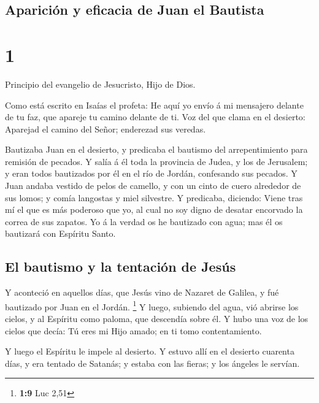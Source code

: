 \hypertarget{apariciuxf3n-y-eficacia-de-juan-el-bautista}{%
\subsection{Aparición y eficacia de Juan el
Bautista}\label{apariciuxf3n-y-eficacia-de-juan-el-bautista}}

\hypertarget{section}{%
\section{1}\label{section}}

 Principio del evangelio de Jesucristo, Hijo de Dios.

 Como está escrito en Isaías el profeta: He aquí yo envío á
mi mensajero delante de tu faz, que apareje tu camino delante de ti.
 Voz del que clama en el desierto: Aparejad el camino del
Señor; enderezad sus veredas.

 Bautizaba Juan en el desierto, y predicaba el bautismo del
arrepentimiento para remisión de pecados.  Y salía á él toda
la provincia de Judea, y los de Jerusalem; y eran todos bautizados por
él en el río de Jordán, confesando sus pecados.  Y Juan
andaba vestido de pelos de camello, y con un cinto de cuero alrededor de
sus lomos; y comía langostas y miel silvestre.  Y predicaba,
diciendo: Viene tras mí el que es más poderoso que yo, al cual no soy
digno de desatar encorvado la correa de sus zapatos.  Yo á
la verdad os he bautizado con agua; mas él os bautizará con Espíritu
Santo.

\hypertarget{el-bautismo-y-la-tentaciuxf3n-de-jesuxfas}{%
\subsection{El bautismo y la tentación de
Jesús}\label{el-bautismo-y-la-tentaciuxf3n-de-jesuxfas}}

 Y aconteció en aquellos días, que Jesús vino de Nazaret de
Galilea, y fué bautizado por Juan en el Jordán. \footnote{\textbf{1:9}
  Luc 2,51}  Y luego, subiendo del agua, vió abrirse los
cielos, y al Espíritu como paloma, que descendía sobre él. 
Y hubo una voz de los cielos que decía: Tú eres mi Hijo amado; en ti
tomo contentamiento.

 Y luego el Espíritu le impele al desierto.  Y
estuvo allí en el desierto cuarenta días, y era tentado de Satanás; y
estaba con las fieras; y los ángeles le servían.

